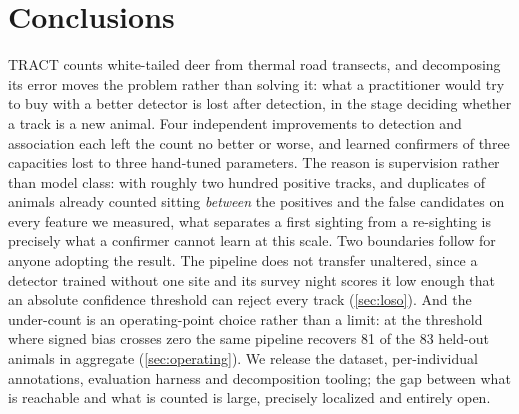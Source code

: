\section{Conclusions}
\label{sec:conclusion}

TRACT counts white-tailed deer from thermal road transects, and decomposing its error moves
the problem rather than solving it: what a practitioner would try to buy with a better
detector is lost after detection, in the stage deciding whether a track is a new animal.
Four independent improvements to detection and association each left the count no better or
worse, and learned confirmers of three capacities lost to three hand-tuned parameters. The
reason is supervision rather than model class: with roughly two hundred positive tracks, and
duplicates of animals already counted sitting \emph{between} the positives and the false
candidates on every feature we measured, what separates a first sighting from a re-sighting
is precisely what a confirmer cannot learn at this scale. Two boundaries follow for anyone
adopting the result. The pipeline does not transfer unaltered, since a detector trained without one site and its survey night scores it low enough that an absolute confidence threshold can reject every track (\cref{sec:loso}). And the under-count is an operating-point choice rather than a
limit: at the threshold where signed bias crosses zero the same pipeline recovers 81 of the
83 held-out animals in aggregate (\cref{sec:operating}). We release the dataset,
per-individual annotations, evaluation harness and decomposition tooling; the gap between
what is reachable and what is counted is large, precisely localized and entirely open.
